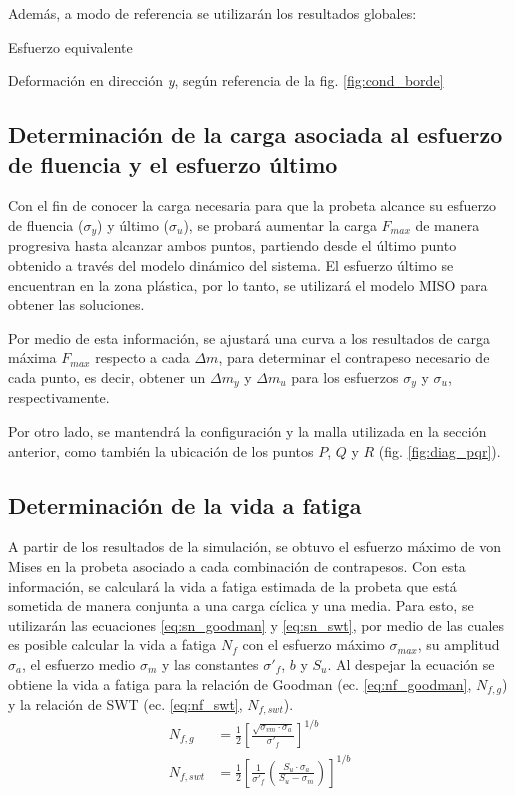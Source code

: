 Además, a modo de referencia se utilizarán los resultados globales:
\begin{itemize*}
	\item Esfuerzo equivalente
	\item Deformación en dirección \textit{y}, según referencia de la fig. \ref{fig:cond_borde}
\end{itemize*}

\subsection{Determinación de la carga asociada al esfuerzo de fluencia y el esfuerzo último}
Con el fin de conocer la carga necesaria para que la probeta alcance su esfuerzo de fluencia ($\sigma_y$) y último ($\sigma_u$), se probará aumentar la carga $F_{max}$ de manera progresiva hasta alcanzar ambos puntos, partiendo desde el último punto obtenido a través del modelo dinámico del sistema. El esfuerzo último se encuentran en la zona plástica, por lo tanto, se utilizará el modelo MISO para obtener las soluciones.

Por medio de esta información, se ajustará una curva a los resultados de carga máxima $F_{max}$ respecto a cada $\Delta m$, para determinar el contrapeso necesario de cada punto, es decir, obtener un $\Delta m_y$ y $\Delta m_u$ para los esfuerzos $\sigma_y$ y $\sigma_u$, respectivamente.

Por otro lado, se mantendrá la configuración y la malla utilizada en la sección anterior, como también la ubicación de los puntos $P$, $Q$ y $R$ (fig. \ref{fig:diag_pqr}).

\newpage

\subsection{Determinación de la vida a fatiga}

A partir de los resultados de la simulación, se obtuvo el esfuerzo máximo de von Mises en la probeta asociado a cada combinación de contrapesos. Con esta información, se calculará la vida a fatiga estimada de la probeta que está sometida de manera conjunta a una carga cíclica y una media. Para esto, se utilizarán las ecuaciones \ref{eq:sn_goodman} y \ref{eq:sn_swt}, por medio de las cuales es posible calcular la vida a fatiga $N_f$ con el esfuerzo máximo $\sigma_{max}$, su amplitud $\sigma_a$, el esfuerzo medio $\sigma_m$ y las constantes $\sigma'_f$, $b$ y $S_u$. Al despejar la ecuación se obtiene la vida a fatiga para la relación de Goodman (ec. \ref{eq:nf_goodman}, $N_{f,g}$) y la relación de SWT (ec. \ref{eq:nf_swt}, $N_{f,swt}$).
\bigskip
\begin{subequations}
\begin{align}
	N_{f,g}  &= \frac{1}{2} \left[\frac{\sqrt{\sigma_{vm}\cdot \sigma_a}}{\sigma'_f} \right]^{1/b} \label{eq:nf_swt} \\[10pt]
	N_{f,swt} &= \frac{1}{2} \left[\frac{1}{\sigma'_f} \left(\frac{S_u \cdot \sigma_a}{S_u - \sigma_m}\right)\right]^{1/b} \label{eq:nf_goodman}
\end{align}
\end{subequations}
\bigskip

